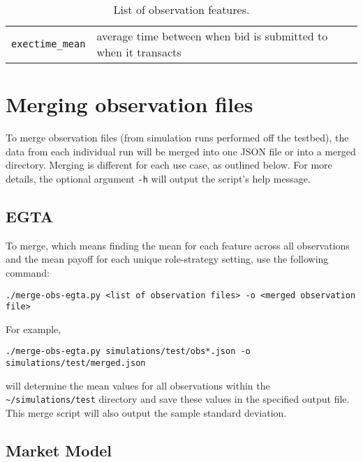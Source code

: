 \documentclass[11pt]{article}
\begin{document}
\begin{table}
\begin{tabular}[f]{p{} p{}}
\verb|exectime_mean|  & average time between when bid is submitted to when it transacts \\

\end{tabular}
\caption{List of observation features.}
\label{tab:obs}
\end{table}


\section{Merging observation files}

To merge observation files (from simulation runs performed off the testbed), the data from each individual run will be merged into one JSON file or into a merged directory.
%
Merging is different for each use case, as outlined below. For more details, the optional argument \verb|-h| will output the script's help message.


\subsection{EGTA}
To merge, which means finding the mean for each feature across all observations and the mean payoff for each unique role-strategy setting, use the following command:
\begin{verbatim}
./merge-obs-egta.py <list of observation files> -o <merged observation file>
\end{verbatim}
For example,
\begin{verbatim}
./merge-obs-egta.py simulations/test/obs*.json -o simulations/test/merged.json
\end{verbatim}
will determine the mean values for all observations within the \verb|~/simulations/test| directory and save these values in the specified output file.
This merge script will also output the sample standard deviation.

\subsection{Market Model}
\end{document}
